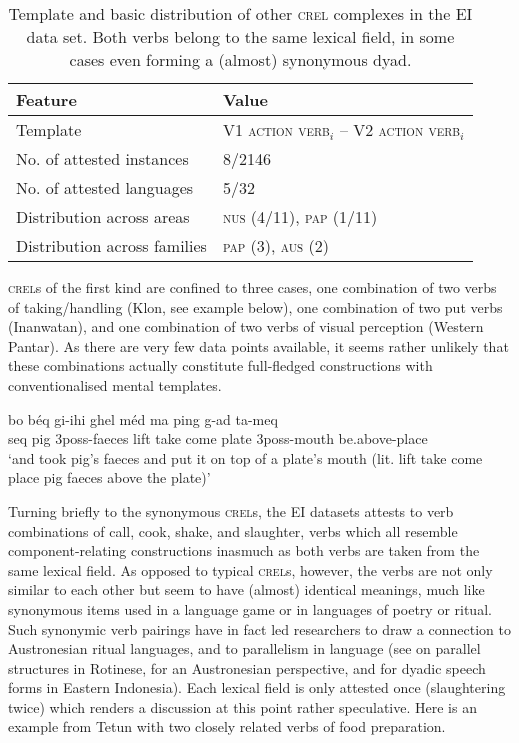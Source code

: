 \begin{table}


\begin{tabular}{ll}
\lsptoprule
Feature&Value\tabularnewline
\hline
Template&V1 \textsc{action verb}$_{i}$ -- V2 \textsc{action verb}$_{i}$\tabularnewline
No. of attested instances& 8/2146 \tabularnewline
No. of attested languages& 5/32 \tabularnewline
Distribution across areas& \textsc{nus} (4/11), \textsc{pap} (1/11) \tabularnewline
Distribution across families& \textsc{pap} (3), \textsc{aus} (2) \tabularnewline
\hline
\end{tabular}
\caption[Template and basic distribution of other \textsc{crel} complexes]{Template and basic distribution of other \textsc{crel} complexes in the EI data set. Both verbs belong to the same lexical field, in some cases even forming a (almost) synonymous dyad.}
\label{table:basiccrelother}
\end{table}


\textsc{crel}s of the first kind are confined to three cases, one combination of two verbs of taking/handling (Klon, see example below), one combination of two put verbs (Inanwatan), and one combination of two verbs of visual perception (Western Pantar). As there are very few data points available, it seems rather unlikely that these combinations actually constitute full-fledged constructions with conventionalised mental templates.

\ea \label{}
\gll bo béq gi-ihi ghel méd ma ping g-ad ta-meq \\
\acs{seq} pig \acs{3}\acs{poss}-faeces lift take come plate \acs{3}\acs{poss}-mouth be.above-place \\
\glft `and took pig's faeces and put it on top of a plate's mouth (lit. lift take come place pig faeces above the plate)' \\ 
\z
\xe

Turning briefly to the synonymous \textsc{crel}s, the EI datasets attests to verb combinations of call, cook, shake, and slaughter, verbs which all resemble component-relating constructions inasmuch as both verbs are taken from the same lexical field. As opposed to typical \textsc{crel}s, however, the verbs are not only similar to each other but seem to have (almost) identical meanings, much like synonymous items used in a language game or in languages of poetry or ritual. Such synonymic verb pairings have in fact led researchers to draw a connection to Austronesian ritual languages, and to parallelism in language (see \cite{fox1971semantic} on parallel structures in Rotinese, \cite{fox2005ritual} for an Austronesian perspective, and \cite{fox2006speak} for dyadic speech forms in Eastern Indonesia). Each lexical field is only attested once (slaughtering twice) which renders a discussion at this point rather speculative. Here is an example from Tetun with two closely related verbs of food preparation.

